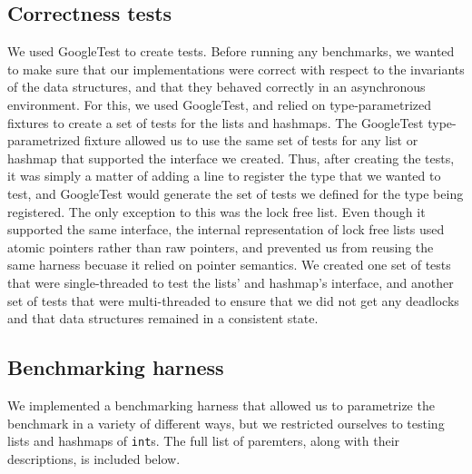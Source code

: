 \documentclass[11pt]{article}
\begin{document}
\subsection{Correctness tests}
We used GoogleTest to create tests. Before running any benchmarks, we wanted to
make sure that our implementations were correct with respect to the invariants
of the data structures, and that they behaved correctly in an asynchronous
environment. For this, we used GoogleTest, and relied on type-parametrized
fixtures to create a set of tests for the lists and hashmaps. The GoogleTest
type-parametrized fixture allowed us to use the same set of tests for any list
or hashmap that supported the interface we created. Thus, after creating the
tests, it was simply a matter of adding a line to register the type that we
wanted to test, and GoogleTest would generate the set of tests we defined for
the type being registered. The only exception to this was the lock free list.
Even though it supported the same interface, the internal representation of lock
free lists used atomic pointers rather than raw pointers, and prevented us from
reusing the same harness becuase it relied on pointer semantics. We created
one set of tests that were single-threaded to test the lists' and hashmap's
interface, and another set of tests that were multi-threaded to ensure that we
did not get any deadlocks and that data structures remained in a consistent
state.

\subsection{Benchmarking harness}
We implemented a benchmarking harness that allowed us to parametrize the
benchmark in a variety of different ways, but we restricted ourselves to testing
lists and hashmaps of {\tt int}s. The full list of paremters, along with their
descriptions, is included below.
\end{document}
